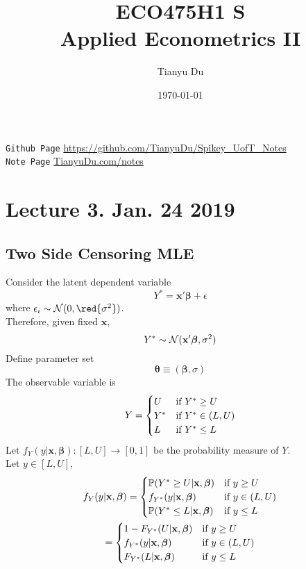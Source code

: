\documentclass[11pt]{article}
\title{ECO475H1 S\\ Applied Econometrics II}
\author{Tianyu Du}
\date{\today}
\newcommand{\bm}[1]{\boldsymbol{#1}}
\begin{document}
	\maketitle
	\doclicenseThis
	\texttt{Github Page} \url{https://github.com/TianyuDu/Spikey_UofT_Notes}\\
	\texttt{Note Page} \url{TianyuDu.com/notes}
	
	\tableofcontents
	\newpage
	
	\section{Lecture 3. Jan. 24 2019}
		\subsection{Two Side Censoring MLE}
		\par Consider the latent dependent variable
		\begin{equation}
			Y^* = \textbf{x}' \bm{\beta} + \epsilon
		\end{equation}
		where $\epsilon_i \sim \mc{N}(0, \red{\sigma^2})$. \\
		Therefore, given fixed $\textbf{x}$,
		\begin{equation}
			Y^* \sim \mc{N}(\textbf{x}' \bm{\beta}, \sigma^2)
		\end{equation}
		Define parameter set 
		\begin{equation}
			\bm{\theta} \equiv (\bm{\beta}, \sigma)
		\end{equation}
		The observable variable is 
		\begin{gather}
			Y = \begin{cases}
				U &\text{{if }} Y^* \geq U \\
				Y^* &\text{{if }} Y^* \in (L, U) \\
				L &\text{{if }} Y^* \leq L
			\end{cases}
		\end{gather}
		Let $f_Y(y|\textbf{x}, \bm{\beta}): [L, U] \to [0, 1]$ be the probability measure of $Y$. \\
		Let $y \in [L, U]$, 
		\begin{gather}
			f_Y(y|\textbf{x}, \bm{\beta}) = \begin{cases}
				\mathbb{P}(Y^* \geq U|\textbf{x}, \bm{\beta}) &\tx{if } y \geq U \\
				f_{Y^*}(y|\textbf{x}, \bm{\beta}) &\tx{if } y \in (L, U) \\
				\mathbb{P}(Y^* \leq L|\textbf{x}, \bm{\beta}) &\tx{if } y \leq L
			\end{cases} \\
			= \begin{cases}
				1 - F_{Y^*}(U|\textbf{x}, \bm{\beta}) &\tx{if } y \geq U \\
				f_{Y^*}(y|\textbf{x}, \bm{\beta}) &\tx{if } y \in (L, U) \\
				F_{Y^*}(L|\textbf{x}, \bm{\beta}) &\tx{if } y \leq L
			\end{cases}
		\end{gather}
\end{document}
